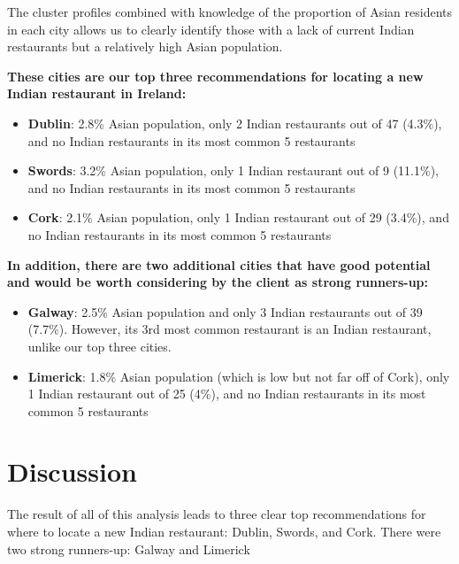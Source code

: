 \documentclass[a4paper,11pt]{article}
\begin{document}
The cluster profiles combined with knowledge of the proportion of Asian residents in each city allows us to clearly identify those with a lack of current Indian restaurants but a relatively high Asian population. 

\textbf{These cities are our top three recommendations for locating a new Indian restaurant in Ireland:}

\begin{itemize}
	\item \textbf{Dublin}: 2.8\% Asian population, only 2 Indian restaurants out of 47 (4.3\%), and no Indian restaurants in its most common 5 restaurants
	\item \textbf{Swords}: 3.2\% Asian population, only 1 Indian restaurant out of 9 (11.1\%), and no Indian restaurants in its most common 5 restaurants
	\item \textbf{Cork}: 2.1\% Asian population, only 1 Indian restaurant out of 29 (3.4\%), and no Indian restaurants in its most common 5 restaurants
\end{itemize}

\textbf{In addition, there are two additional cities that have good potential and would be worth considering by the client as strong runners-up:}  

\begin{itemize}
	\item \textbf{Galway}: 2.5\% Asian population and only 3 Indian restaurants out of 39 (7.7\%). However, its 3rd most common restaurant is an Indian restaurant, unlike our top three cities.
	\item \textbf{Limerick}: 1.8\% Asian population (which is low but not far off of Cork), only 1 Indian restaurant out of 25 (4\%), and no Indian restaurants in its most common 5 restaurants
\end{itemize}

\section{Discussion}



The result of all of this analysis leads to three clear top recommendations for where to locate a new Indian restaurant: Dublin, Swords, and Cork. There were two strong runners-up: Galway and Limerick
\end{document}
